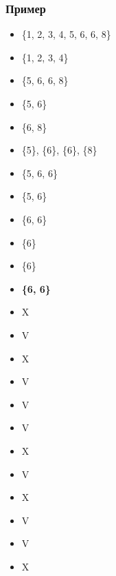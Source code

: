 
\begin{frame}[fragile]
	\frametitle{Пример}
\begin{minipage}[t]{0.48\linewidth}
		\begin{itemize}
		\item[] \{1, 2, 3, 4, 5, 6, 6, 8\} 
		\item[] \{1, 2, 3, 4\}			  
		\item[] \{5, 6, 6, 8\}
		\item[] \{5, 6\}
		\item[] \{6, 8\}
		\item[] \{5\}, \{6\}, \{6\}, \{8\}
		\item[] \{5, 6, 6\}
		\item[] \{5, 6\}
		\item[] \{6, 6\}
		\item[] \{6\}
		\item[] \{6\}
		\item[] \textbf{\{6, 6\}}
	\end{itemize}
\end{minipage}
\begin{minipage}[t]{0.48\linewidth}
		\begin{itemize}
		\item[] {\color{red}X}
		\item[] {\color{forest}V}	  
		\item[] {\color{red}X}
		\item[] {\color{forest}V}
		\item[] {\color{forest}V}
		\item[] {\color{forest}V}
		\item[] {\color{red}X}
		\item[] {\color{forest}V}
		\item[] {\color{red}X}
		\item[] {\color{forest}V}
		\item[] {\color{forest}V}
		\item[] {\color{red}X}
	\end{itemize}
\end{minipage}

\end{frame}


